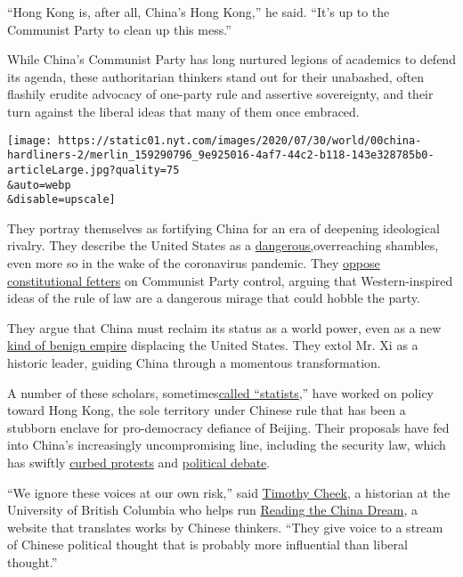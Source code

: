 ``Hong Kong is, after all, China's Hong Kong,'' he said. ``It's up to
the Communist Party to clean up this mess.''

While China's Communist Party has long nurtured legions of academics to
defend its agenda, these authoritarian thinkers stand out for their
unabashed, often flashily erudite advocacy of one-party rule and
assertive sovereignty, and their turn against the liberal ideas that
many of them once embraced.

\texttt{[image: https://static01.nyt.com/images/2020/07/30/world/00china-hardliners-2/merlin\_159290796\_9e925016-4af7-44c2-b118-143e328785b0-articleLarge.jpg?quality=75\\\&auto=webp\\\&disable=upscale]}

They portray themselves as fortifying China for an era of deepening
ideological rivalry. They describe the United States as a
\href{http://www.publiclaw.cn/?c=news\&m=view\&id=7852}{dangerous,}overreaching
shambles, even more so in the wake of the coronavirus pandemic. They
\href{http://history.sina.com.cn/his/zl/2015-08-04/1454123837.shtml}{oppose
constitutional fetters} on Communist Party control, arguing that
Western-inspired ideas of the rule of law are a dangerous mirage that
could hobble the party.

They argue that China must reclaim its status as a world power, even as
a new
\href{https://www.readingthechinadream.com/jiang-shigong-empire-and-world-order.html}{kind
of benign empire} displacing the United States. They extol Mr. Xi as a
historic leader, guiding China through a momentous transformation.

A number of these scholars,
sometimes\href{https://www.researchgate.net/publication/326028916_The_Specter_of_Leviathan_A_Critique_of_Chinese_Statism_since_2000}{called
``statists},'' have worked on policy toward Hong Kong, the sole
territory under Chinese rule that has been a stubborn enclave for
pro-democracy defiance of Beijing. Their proposals have fed into China's
increasingly uncompromising line, including the security law, which has
swiftly
\href{https://www.nytimes.com/2020/07/01/world/asia/hong-kong-security-law-china.html}{curbed
protests} and
\href{https://www.nytimes.com/2020/07/08/world/asia/hong-kong-security-china-media.html}{political
debate}.

``We ignore these voices at our own risk,'' said
\href{https://history.ubc.ca/profile/timothy-cheek/}{Timothy Cheek}, a
historian at the University of British Columbia who helps run
\href{https://www.readingthechinadream.com/}{Reading the China Dream}, a
website that translates works by Chinese thinkers. ``They give voice to
a stream of Chinese political thought that is probably more influential
than liberal thought.''


